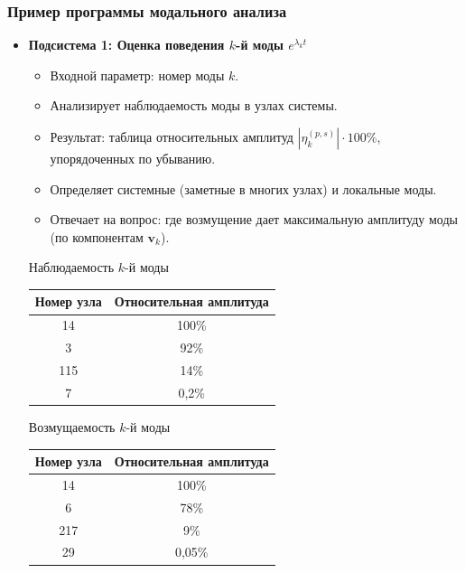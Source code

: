 	\subsubsection*{Пример программы модального анализа}
	\begin{itemize}
		\item \textbf{Подсистема 1: Оценка поведения $k$-й моды $e^{\lambda_k t}$}
		\begin{itemize}
			\item Входной параметр: номер моды $k$.
			\item Анализирует наблюдаемость моды в узлах системы.
			\item Результат: таблица относительных амплитуд $\left|\eta_k^{(p,s)}\right|\cdot 100\%$, упорядоченных по убыванию.
			\item Определяет системные (заметные в многих узлах) и локальные моды.
			\item Отвечает на вопрос: где возмущение дает максимальную амплитуду моды (по компонентам $\mathbf{v}_k$).
		\end{itemize}
		\begin{table}[H]
			\centering
			\begin{minipage}{0.48\textwidth}
				\centering
				{\small Наблюдаемость $k$-й моды}
				\begin{tabular}{c | c}
					\toprule
					Номер узла & Относительная амплитуда \\
					\midrule
					14 & 100\% \\
					3 & 92\% \\
					115 & 14\% \\
					7 & 0,2\% \\
					\bottomrule
				\end{tabular}
			\end{minipage}
			\hfill
			\begin{minipage}{0.48\textwidth}
				\centering
				{\small Возмущаемость $k$-й моды}
				\begin{tabular}{c | c}
					\toprule
					Номер узла & Относительная амплитуда \\
					\midrule
					14 & 100\% \\
					6 & 78\% \\
					217 & 9\% \\
					29 & 0,05\% \\
					\bottomrule
				\end{tabular}
			\end{minipage}
		\end{table}
		

\end{itemize}
